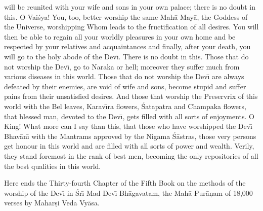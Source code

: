 will be reunited with your wife and sons in your own palace; there is no doubt in this. O Vai\'sya! You, too, better worship the same Mah\=a May\=a, the Goddess of the Universe, worshipping Whom leads to the fructification of all desires. You will then be able to regain all your worldly pleasures in your own home and be respected by your relatives and acquaintances and finally, after your death, you will go to the holy abode of the Dev\={\i}. There is no doubt in this. Those that do not worship the Dev\={\i}, go to Naraka or hell; moreover they suffer much from various diseases in this world. Those that do not worship the Dev\={\i} are always defeated by their enemies, are void of wife and sons, become stupid and suffer pains from their unsatisfied desires. And those that worship the Preservrix of this world with the Bel leaves, Karav\={\i}ra flowers, \'Satapatra and Champaka flowers, that blessed man, devoted to the Dev\={\i}, gets filled with all sorts of enjoyments. O King! What more can I say than this, that those who have worshipped the Dev\={\i} Bhav\=an\={\i} with the Mantrams approved by the Nigama \'S\=astras, those very persons get honour in this world and are filled with all sorts of power and wealth. Verily, they stand foremost in the rank of best men, becoming the only repositories of all the best qualities in this world.

Here ends the Thirty-fourth Chapter of the Fifth Book on the methods of the worship of the Dev\={\i} in \'Sr\={\i} Mad Dev\={\i} Bh\=agavatam, the Mah\=a Pur\=a\d{n}am of 18,000 verses by Mahar\d{s}i Veda Vy\=asa.



